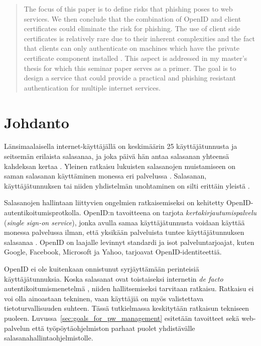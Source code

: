 \documentclass[english,gradu]{tktltiki}
\begin{document}
\begin{abstract}
The focus of this paper is to define risks that phishing poses to web services. We then conclude that the combination of OpenID and client certificates could eliminate the risk for phishing. The use of client side certificates is relatively rare due to their inherent complexities and the fact that clients can only authenticate on machines which have the private certificate component installed \cite{owasp_tls_cheatsheet}. This aspect is addressed in my master's thesis for which this seminar paper serves as a primer. The goal is to design a service that could provide a practical and phishing resistant authentication for multiple internet services.

\end{abstract}

\setcounter{tocdepth}{3}
\mytableofcontents


\section{Johdanto}

Länsimaalaisella internet-käyttäjällä on keskimäärin 25 käyttäjätunnusta ja seitsemän erilaista salasanaa, ja joka päivä hän antaa salasanan yhteensä kahdeksan kertaa \cite{study_of_passwords_07}. Yleinen ratkaisu lukuisten salasanojen muistamiseen on  saman salasanan käyttäminen monessa eri palvelussa \cite{password_management_strategies_06}. Salasanan, käyttäjätunnuksen tai niiden yhdistelmän unohtaminen on silti erittäin yleistä \cite{will_we_ever_escape_passwords_05}.

Salasanojen hallintaan liittyvien ongelmien ratkaisemiseksi on kehitetty OpenID-autentikoitumisprotkolla. OpenID:n tavoitteena on tarjota \emph{kertakirjautumispalvelu} (\emph{single sign-on service}), jonka avulla samaa käyttäjätunnusta voidaan käyttää monessa palvelussa ilman, että yksikään palveluista tuntee käyttäjätunnuksen salasanaa \cite{openid_2.0_platform_2009}. OpenID on laajalle levinnyt standardi ja isot palveluntarjoajat, kuten Google, Facebook, Microsoft ja Yahoo, tarjoavat OpenID-identiteettiä.

OpenID ei ole kuitenkaan onnistunut syrjäyttämään perinteisiä käyttäjätunnuksia. Koska salasanat ovat toistaiseksi internetin \emph{de facto} autentikoitumismenetelmä \cite{study_of_passwords_07, passpet_06, password_management_strategies_06, pwdhash_extension_05}, niiden hallitsemiseksi tarvitaan ratkaisu. Ratkaisu ei voi olla ainoastaan tekninen, vaan käyttäjiä on myös valistettava tietoturvallisuuden suhteen. Tässä tutkielmassa keskitytään ratkaisun tekniseen puoleen. Luvussa~\ref{sec:goals_for_pw_management} esitetään tavoitteet sekä web-palvelun että työpöytäohjelmiston parhaat puolet yhdistävälle salasanahallintaohjelmistolle.
\end{document}
